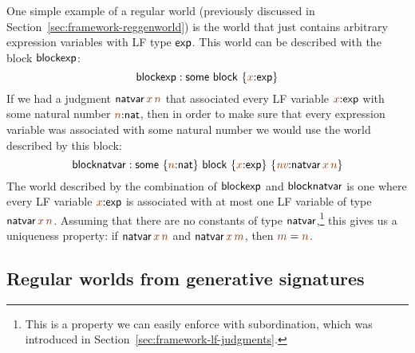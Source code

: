 One simple example of a regular world (previously discussed in
Section~\ref{sec:framework-reggenworld}) is the world that just
contains arbitrary expression variables with LF type ${\sf exp}$. This
world can be described with the block ${\sf blockexp}$:
\[
 {\sf blockexp} : 
 {\sf some}
~{\sf block}~\{{\lf x}{:}{\sf exp}\}
\]
If we had a judgment ${\sf natvar}\,\lf{x}\,\lf{n}$ that associated
every LF variable $\lf{x}{:}{\sf exp}$ with some natural number
$\lf{n}{:}{\sf nat}$, then in order to make sure that every expression
variable was associated with some natural number we would use the world
described by this block:
\[
 {\sf blocknatvar} : 
 {\sf some}~\{{\lf n}{:}{\sf nat}\}
~{\sf block}~\{{\lf x}{:}{\sf exp}\}~
               \{\lf{\it nv}{:}{\sf natvar}\,\lf{x}\,\lf{n}\}
\]
The world described by the combination of ${\sf blockexp}$ and ${\sf
  blocknatvar}$ is one where every LF variable $\lf{x}{:}{\sf exp}$ is
associated with at most one LF variable of type ${\sf
  natvar}\,\lf{x}\,\lf{n}$. Assuming that there are no constants of
type ${\sf natvar}$,\footnote{This is a property we can easily enforce
  with subordination, which was introduced in
  Section~\ref{sec:framework-lf-judgments}.} this gives us a
uniqueness property: if ${\sf natvar}\,\lf{x}\,\lf{n}$ and ${\sf
  natvar}\,\lf{x}\,\lf{m}$, then $\lf{m} = \lf{n}$.

\subsection{Regular worlds from generative signatures}

